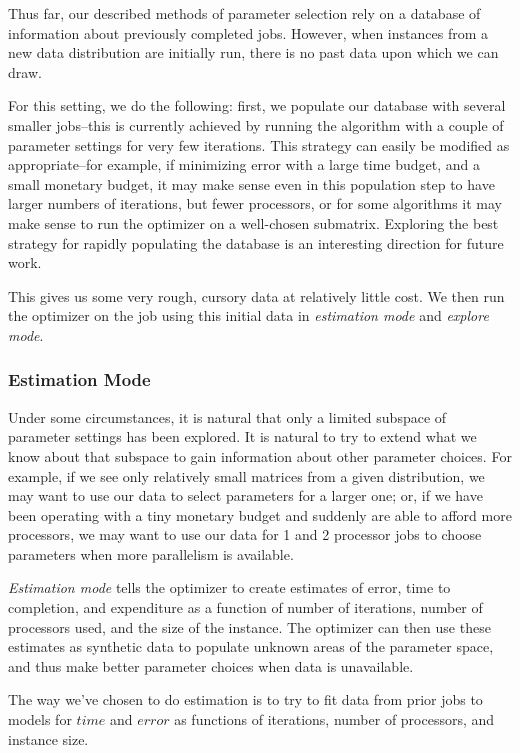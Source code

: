 Thus far, our described methods of parameter selection rely on a database
of information about previously completed jobs. However, when instances
from a new data distribution are initially run, there is no past data upon
which we can draw.

For this setting, we do the following: first, we populate our database 
with several smaller jobs--this is currently achieved by running the 
algorithm with a couple of parameter settings for very few iterations. 
This strategy can easily be modified as appropriate--for example, if
minimizing error with a large time budget, and a small monetary budget, 
it may make sense even in this population step 
to have larger numbers of iterations, but fewer processors, or for some
algorithms it may make sense to run the optimizer on a well-chosen 
submatrix. Exploring the best strategy for rapidly populating the database
is an interesting direction for future work.

This gives us some very rough, cursory data at relatively 
little cost. We then run the optimizer on the job using this initial data
in {\em estimation mode} and {\em explore mode}.

\subsubsection{Estimation Mode}
\label{sec:estimate}
Under some circumstances, it is natural that only a limited subspace
of parameter settings has been explored. It is natural to try to extend
what we know about that subspace to gain information about other parameter
choices. For example, if we see only
relatively small matrices from a given distribution, we may want to use
our data to select parameters for a larger one; or, if we have been
operating with a tiny monetary budget and suddenly are able to afford
more processors, we may want to use our data for 1 and 2 processor
jobs to choose parameters when more parallelism is available. 

{\em Estimation mode} tells the optimizer to create estimates of error, time to completion, and expenditure as a function of number of 
iterations, number of processors used, and the size of the instance. The 
optimizer can then use these estimates as synthetic data to populate
unknown areas of the parameter space, and thus make better parameter
choices when data is unavailable. 

The way we've chosen to do estimation is to try to fit data from
prior jobs to models for $time$ and $error$ as functions of iterations, 
number of processors, and instance size. 


